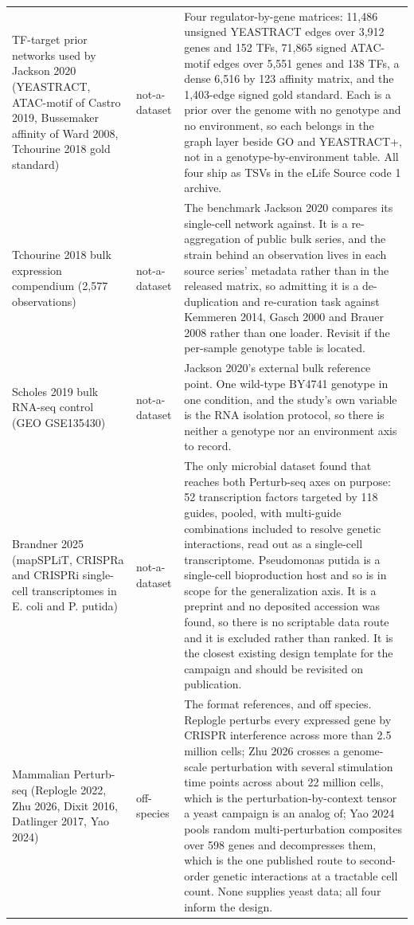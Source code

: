 \begin{longtable}{@{}L{62mm} L{22mm} L{85mm}@{}}
\addlinespace[5pt]
TF-target prior networks used by Jackson 2020 (YEASTRACT, ATAC-motif of Castro 2019, Bussemaker affinity of Ward 2008, Tchourine 2018 gold standard) & not-a-dataset & Four regulator-by-gene matrices: 11,486 unsigned YEASTRACT edges over 3,912 genes and 152 TFs, 71,865 signed ATAC-motif edges over 5,551 genes and 138 TFs, a dense 6,516 by 123 affinity matrix, and the 1,403-edge signed gold standard. Each is a prior over the genome with no genotype and no environment, so each belongs in the graph layer beside GO and YEASTRACT+, not in a genotype-by-environment table. All four ship as TSVs in the eLife Source code 1 archive. \\
\addlinespace[5pt]
Tchourine 2018 bulk expression compendium (2,577 observations) & not-a-dataset & The benchmark Jackson 2020 compares its single-cell network against. It is a re-aggregation of public bulk series, and the strain behind an observation lives in each source series' metadata rather than in the released matrix, so admitting it is a de-duplication and re-curation task against Kemmeren 2014, Gasch 2000 and Brauer 2008 rather than one loader. Revisit if the per-sample genotype table is located. \\
\addlinespace[5pt]
Scholes 2019 bulk RNA-seq control (GEO GSE135430) & not-a-dataset & Jackson 2020's external bulk reference point. One wild-type BY4741 genotype in one condition, and the study's own variable is the RNA isolation protocol, so there is neither a genotype nor an environment axis to record. \\
\addlinespace[5pt]
Brandner 2025 (mapSPLiT, CRISPRa and CRISPRi single-cell transcriptomes in E. coli and P. putida) & not-a-dataset & The only microbial dataset found that reaches both Perturb-seq axes on purpose: 52 transcription factors targeted by 118 guides, pooled, with multi-guide combinations included to resolve genetic interactions, read out as a single-cell transcriptome. Pseudomonas putida is a single-cell bioproduction host and so is in scope for the generalization axis. It is a preprint and no deposited accession was found, so there is no scriptable data route and it is excluded rather than ranked. It is the closest existing design template for the campaign and should be revisited on publication. \\
\addlinespace[5pt]
Mammalian Perturb-seq (Replogle 2022, Zhu 2026, Dixit 2016, Datlinger 2017, Yao 2024) & off-species & The format references, and off species. Replogle perturbs every expressed gene by CRISPR interference across more than 2.5 million cells; Zhu 2026 crosses a genome-scale perturbation with several stimulation time points across about 22 million cells, which is the perturbation-by-context tensor a yeast campaign is an analog of; Yao 2024 pools random multi-perturbation composites over 598 genes and decompresses them, which is the one published route to second-order genetic interactions at a tractable cell count. None supplies yeast data; all four inform the design. \\

\end{longtable}
